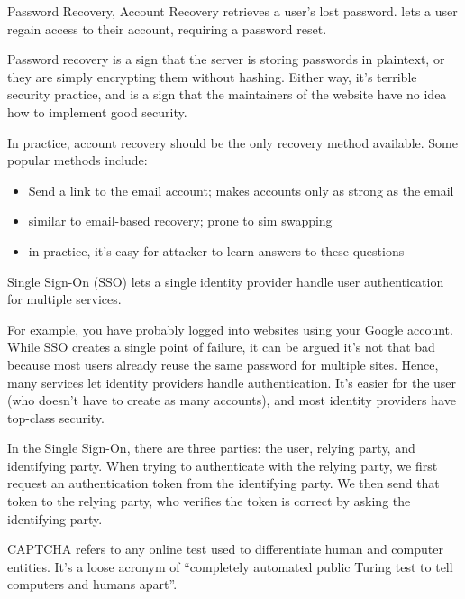 \documentclass[code]{amznotes}
\begin{document}
\begin{dfnbox}{Password Recovery, Account Recovery}{}
     retrieves a user's lost password.  lets a user regain access to their account, requiring a password reset.
\end{dfnbox}

Password recovery is a sign that the server is storing passwords in plaintext, or they are simply encrypting them without hashing. Either way, it's terrible security practice, and is a sign that the maintainers of the website have no idea how to implement good security.

In practice, account recovery should be the only recovery method available. Some popular methods include:
\begin{itemize}[noitemsep]
    \item {} Send a link to the email account; makes accounts only as strong as the email
    \item {} similar to email-based recovery; prone to sim swapping
    \item {} in practice, it's easy for attacker to learn answers to these questions
\end{itemize}

\begin{dfnbox}{Single Sign-On (SSO)}{}
     lets a single identity provider handle user authentication for multiple services.
\end{dfnbox}

For example, you have probably logged into websites using your Google account. While SSO creates a single point of failure, it can be argued it's not that bad because most users already reuse the same password for multiple sites. Hence, many services let identity providers handle authentication. It's easier for the user (who doesn't have to create as many accounts), and most identity providers have top-class security.

In the Single Sign-On, there are three parties: the user, relying party, and identifying party. When trying to authenticate with the relying party, we first request an authentication token from the identifying party. We then send that token to the relying party, who verifies the token is correct by asking the identifying party.

\begin{dfnbox}{CAPTCHA}{}
     refers to any online test used to differentiate human and computer entities. It's a loose acronym of ``completely automated public Turing test to tell computers and humans apart''.
\end{dfnbox}
\end{document}
